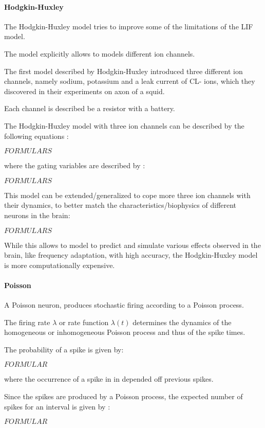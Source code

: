 \paragraph{Hodgkin-Huxley}

The Hodgkin-Huxley model tries to improve some of the limitations of the LIF model.

The model explicitly allows to models different ion channels. 

The first model described by Hodgkin-Huxley introduced three different ion channels, namely sodium, potassium and a leak current of CL- ions, which they discovered in their experiments on axon of a squid.

Each channel is described be a resistor with a battery.

The Hodgkin-Huxley model with three ion channels can be described by the following equations :

$FORMULARS$

where the gating variables are described by :

$FORMULARS$

This model can be extended/generalized to cope more three ion channels with their dynamics, to better match the characteristics/biophysics of different neurons in the brain:

$FORMULARS$

While this allows to model to predict and simulate various effects observed in the brain, like frequency adaptation, with high accuracy, the Hodgkin-Huxley model is more computationally expensive.

\paragraph{Poisson}

A Poisson neuron, produces stochastic firing according to a Poisson process.

The firing rate $\lambda$ or rate function $\lambda(t)$ determines the dynamics of the homogeneous or inhomogeneous Poisson process and thus of the spike times.   

The probability of a spike is given by: 

$FORMULAR$

where the occurrence of a spike in in depended off previous spikes. 

Since the spikes are produced by a Poisson process, the expected number of spikes for an interval is given by :

$FORMULAR$ 


